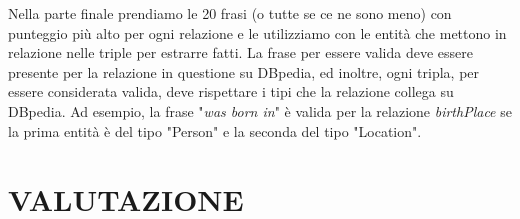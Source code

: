 \documentclass[10pt,a4paper,twocolumn]{article}
\begin{document}
Nella parte finale prendiamo le 20 frasi (o tutte se ce ne sono meno) con punteggio più alto per ogni relazione e le utilizziamo con le entità che mettono in relazione nelle triple per estrarre fatti. La frase per essere valida deve essere presente per la relazione in questione su DBpedia, ed inoltre, ogni tripla, per essere considerata valida, deve rispettare i tipi che la relazione collega su DBpedia. Ad esempio, la frase "\textit{was born in}" è valida per la relazione \textit{birthPlace} se la prima entità è del tipo "Person" e la seconda del tipo "Location".

\section{VALUTAZIONE}
\end{document}
